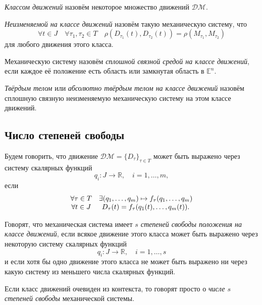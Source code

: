 \begin{definition}
  \textit{Классом движений} назовём некоторое множество движений $\mathcal{DM}$.
\end{definition}

\begin{definition}
  \textit{Неизменяемой на классе движений} назовём такую механическую систему,
  что
  \begin{equation*}
    \forall t \in J \quad \forall \tau_1, \tau_2 \in T \quad
      \rho(D_{\tau_1}(t), D_{\tau_2}(t)) = \rho(M_{\tau_1}, M_{\tau_2})
  \end{equation*}
  для любого движения этого класса.
\end{definition}

\begin{definition}
  Механическую систему назовём \textit{сплошной связной средой на классе
  движений}, если каждое её положение есть область или замкнутая область в
  $\mathbb{E}^n$.
\end{definition}

\begin{definition}
  \textit{Твёрдым телом} или \textit{абсолютно твёрдым телом на классе движений}
  назовём сплошную связную неизменяемую механическую систему на этом классе
  движений.
\end{definition}

\subsection{Число степеней свободы}

Будем говорить, что движение $\mathcal{DM} = \{ D_\tau \}_{\tau \in T}$ может
быть выражено через систему скалярных функций
\begin{equation*}
  q_i : J \to \mathbb{R}, \quad i = 1, \dots, m,
\end{equation*}
если
\begin{equation}
  \begin{array}{c c}
    \forall \tau \in T & \exists (q_1, \dots, q_m) \mapsto
      f_\tau(q_1, \dots, q_m) \\
    \forall t \in J & D_\tau(t) = f_\tau(q_1(t), \dots, q_m(t)).
  \end{array}
\end{equation}

\begin{definition}
  Говорят, что механическая система имеет \textit{$s$ степеней свободы положения
  на классе движений}, если всякое движение этого класса может быть выражено
  через некоторую систему скалярных функций
  \begin{equation*}
    q_i : J \to \mathbb{R}, \quad i = 1, \dots, s
  \end{equation*}
  и если хотя бы одно движение этого класса не может быть выражено ни через
  какую систему из меньшего числа скалярных функций.

  Если класс движений очевиден из контекста, то говорят просто о \textit{числе
  $s$ степеней свободы} механической системы.
\end{definition}

